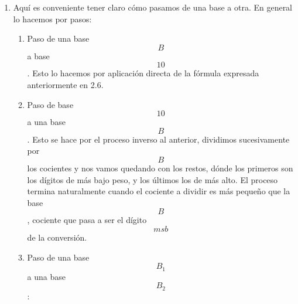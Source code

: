 \begin{enumerate}
\begin{enumerate}
    \[r \in {d_{i \neq 0} \cdot {\lbrack\mathbf{D}_{\mathbf{\mathrm{n}}}\rbrack}^{\ast}}\]
    será
    \[\nu{(r)}{=}{\sum\limits_{\iota = 0}^{l{{(r)} - 1}}{({\nu{{(d_{\mathbf{\mathrm{\iota}}})} \cdot {(n^{\mathbf{\mathrm{\iota}}})}}})}}\],
    y \[l{(r)}\] es la longitud de la representación \[r\]. Este tipo de
    representación es la más usada en el ámbito de los números desde
    hace seiscientos o setecientos años más o menos en Occidente, sólo
    que para base 10 (diez dígitos distintos). Nosotros usaremos también
    bastante la base 2, código que llamamos habitualmente binario
    natural.
  \item
    Aquí es conveniente tener claro cómo pasamos de una base a otra. En
    general lo ha\-cemos por pasos:

    \begin{enumerate}
    \def\labelenumiii{\arabic{enumiii}.}
    \item
      Paso de una base \[B\] a base \[10\]. Esto lo hacemos por
      aplicación directa de la fórmula expresada anteriormente en 2.6.
    \item
      Paso de base \[10\] a una base \[B\]. Esto se hace por el proceso
      inverso al ante\-rior, dividimos sucesivamente por \[B\]los
      cocientes y nos vamos quedando con los restos, dónde los primeros
      son los dígitos de más bajo peso, y los últimos los de más alto.
      El proceso termina naturalmente cuando el cociente a dividir es
      más pequeño que la base \[B\], cociente que pasa a ser el dígito
      \[\mathbf{\mathit{msb}}\]de la conver\-sión.
    \item
      Paso de una base \[B_{1}\] a una base \[B_{2}\]:


\end{enumerate}
\end{enumerate}
\end{enumerate}
